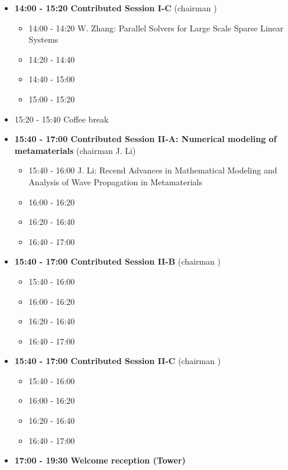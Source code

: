 \documentclass[10pt, A4]{article}%
\begin{document}
\begin{itemize}
\begin{itemize}
  \end{itemize}
    \item {\bf 14:00 - 15:20 Contributed Session I-C} (chairman ) 
  \begin{itemize}
    \item 14:00 - 14:20 {W. Zhang}: {Parallel Solvers for Large Scale Sparse Linear Systems}
    \item 14:20 - 14:40 
    \item 14:40 - 15:00 
    \item 15:00 - 15:20 
  \end{itemize}
  \item 15:20 - 15:40 Coffee break
  \item {\bf 15:40 - 17:00 Contributed Session II-A: Numerical modeling of metamaterials} (chairman J. Li) 
  \begin{itemize}
    \item 15:40 - 16:00 {J. Li}: {Recend Advances in Mathematical Modeling and Analysis of Wave Propagation in Metamaterials}
    \item 16:00 - 16:20 
    \item 16:20 - 16:40 
    \item 16:40 - 17:00 
  \end{itemize}
  \item {\bf 15:40 - 17:00 Contributed Session II-B} (chairman ) 
  \begin{itemize}
    \item 15:40 - 16:00
    \item 16:00 - 16:20 
    \item 16:20 - 16:40 
    \item 16:40 - 17:00 
  \end{itemize}
    \item {\bf 15:40 - 17:00 Contributed Session II-C} (chairman ) 
  \begin{itemize}
    \item 15:40 - 16:00
    \item 16:00 - 16:20 
    \item 16:20 - 16:40 
    \item 16:40 - 17:00 
  \end{itemize}    
  \item {\bf 17:00 - 19:30 Welcome reception (Tower)} 
\end{itemize}
\end{document}
